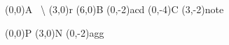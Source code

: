 \documentclass{article}
\begin{document}
\begin{erdiagram}
  (0,0){A \textbar\ \textbackslash}
  (3,0){r \textbar}
  (6,0){B}
  (0,-2){a}{c\textbar d}
  (0,-4){C}
  \note(3,-2){\textbar note\textbar}
\end{erdiagram}
\begin{gsmdiagram}
  (0,0){P \textbar}
  (3,0){N}
  (0,-2){\textbar agg\textbar}
\end{gsmdiagram}
\end{document}
